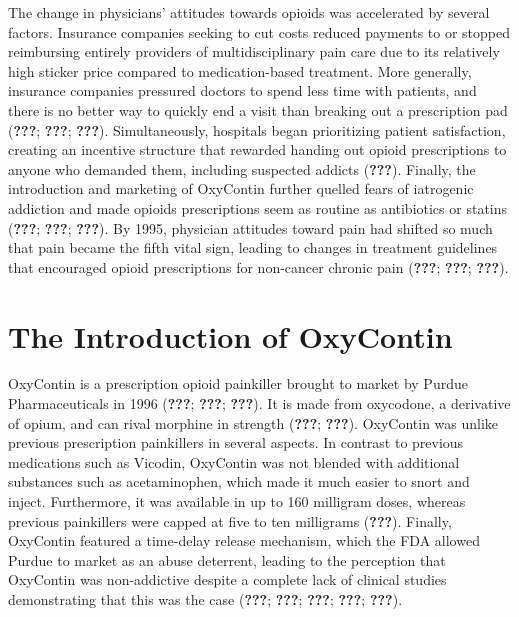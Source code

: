 \documentclass[12pt,twoside]{reedthesis}
\begin{document}
The change in physicians' attitudes towards opioids was accelerated by several factors. Insurance companies seeking to cut costs reduced payments to or stopped reimbursing entirely providers of multidisciplinary pain care due to its relatively high sticker price compared to medication-based treatment. More generally, insurance companies pressured doctors to spend less time with patients, and there is no better way to quickly end a visit than breaking out a prescription pad ({\textbf{???}}; {\textbf{???}}; {\textbf{???}}). Simultaneously, hospitals began prioritizing patient satisfaction, creating an incentive structure that rewarded handing out opioid prescriptions to anyone who demanded them, including suspected addicts ({\textbf{???}}). Finally, the introduction and marketing of OxyContin further quelled fears of iatrogenic addiction and made opioids prescriptions seem as routine as antibiotics or statins ({\textbf{???}}; {\textbf{???}}; {\textbf{???}}). By 1995, physician attitudes toward pain had shifted so much that pain became the fifth vital sign, leading to changes in treatment guidelines that encouraged opioid prescriptions for non-cancer chronic pain ({\textbf{???}}; {\textbf{???}}; {\textbf{???}}).

\hypertarget{the-introduction-of-oxycontin}{%
\section{The Introduction of OxyContin}\label{the-introduction-of-oxycontin}}

OxyContin is a prescription opioid painkiller brought to market by Purdue Pharmaceuticals in 1996 ({\textbf{???}}; {\textbf{???}}; {\textbf{???}}). It is made from oxycodone, a derivative of opium, and can rival morphine in strength ({\textbf{???}}; {\textbf{???}}). OxyContin was unlike previous prescription painkillers in several aspects. In contrast to previous medications such as Vicodin, OxyContin was not blended with additional substances such as acetaminophen, which made it much easier to snort and inject. Furthermore, it was available in up to 160 milligram doses, whereas previous painkillers were capped at five to ten milligrams ({\textbf{???}}). Finally, OxyContin featured a time-delay release mechanism, which the FDA allowed Purdue to market as an abuse deterrent, leading to the perception that OxyContin was non-addictive despite a complete lack of clinical studies demonstrating that this was the case ({\textbf{???}}; {\textbf{???}}; {\textbf{???}}; {\textbf{???}}; {\textbf{???}}).
\end{document}

